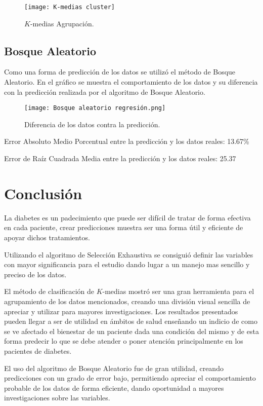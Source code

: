\documentclass{article}
\begin{document}
\begin{figure}[hbt!]
\centering
\texttt{[image: K-medias cluster]}
\caption{$K$-medias Agrupación.}
\label{fig:cluster}
\end{figure}

\subsection{Bosque Aleatorio}
Como una forma de predicción de los datos se utilizó el método de Bosque Aleatorio. En el gráfico se muestra el comportamiento de los datos y su diferencia con la predicción realizada por el algoritmo de Bosque Aleatorio.

\begin{figure}[hbt!]
\centering
\texttt{[image: Bosque aleatorio regresión.png]}
\caption{Diferencia de los datos contra la predicción.}
\label{fig:cluster}
\end{figure}


Error Absoluto Medio Porcentual entre la predicción y los datos reales: 13.67\%

Error de Raíz Cuadrada Media entre la predicción y los datos reales: 25.37

\section{Conclusión}
La diabetes es un padecimiento que puede ser difícil de tratar de forma efectiva en cada paciente, crear predicciones muestra ser una forma útil y eficiente de apoyar dichos tratamientos.

Utilizando el algoritmo de Selección Exhaustiva se consiguió definir las variables con mayor significancia para el estudio dando lugar a un manejo mas sencillo y preciso de los datos.

El método de clasificación de $K$-medias mostró ser una gran herramienta para el agrupamiento de los datos mencionados, creando una división visual sencilla de apreciar y utilizar para mayores investigaciones. Los resultados presentados pueden llegar a ser de utilidad en ámbitos de salud enseñando un indicio de como se ve afectado el bienestar de un paciente dada una condición del mismo y de esta forma predecir lo que se debe atender o poner atención principalmente en los pacientes de diabetes. 

El uso del algoritmo de Bosque Aleatorio fue de gran utilidad, creando predicciones con un grado de error bajo, permitiendo apreciar el comportamiento probable de los datos de forma eficiente, dando oportunidad a mayores investigaciones sobre las variables.
\end{document}

